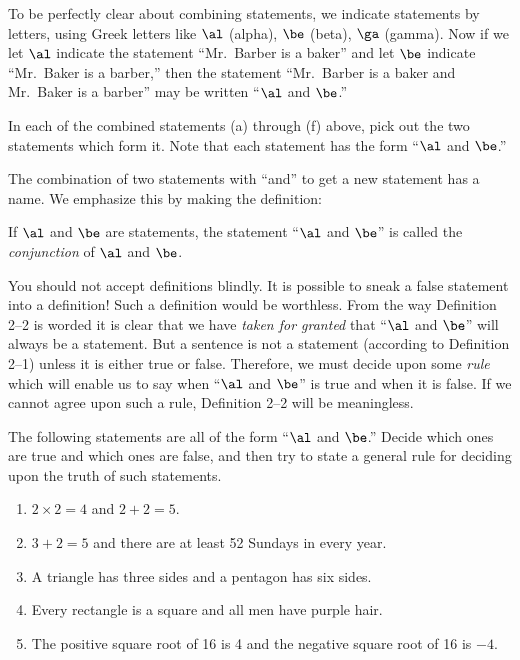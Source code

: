 \documentclass[11pt]{book}
\theoremstyle{bkplain}
\theoremstyle{XIplainnote}
\theoremstyle{bkplain}
\theoremstyle{bkplain}
\begin{document}
To be perfectly clear about combining statements, we indicate statements by
letters, using Greek letters like $\al$ (alpha), $\be$ (beta),
$\ga$ (gamma). Now if we let $\al$ indicate the statement ``Mr.\ Barber is a
baker'' and let $\be$ indicate ``Mr.\ Baker is a barber,'' then the statement
``Mr.\ Barber is a baker and Mr.\ Baker is a barber'' may be written
``$\al$ and $\be$.''

\begin{IIproblem}
In each of the combined statements (a) through (f) above, pick
out the two statements which form it. Note that each statement has the form
``$\al$ and $\be$.''
\end{IIproblem}

The combination of two statements with ``and'' to get a new statement has a name.
We emphasize this by making the definition:

\begin{definition}
If $\al$ and $\be$ are statements, the statement ``$\al$ and $\be$'' is called the
\emph{conjunction} of $\al$ and $\be$.
\end{definition}

You should not accept definitions blindly. It is possible to sneak a false
statement into a definition! Such a definition would be worthless. From the way
Definition 2--2 is worded it is clear that we have \emph{taken for granted} that
``$\al$ and $\be$'' will always be a statement. But a sentence is not a statement
(according to Definition 2--1) unless it is either true or false. Therefore, we
must decide upon some \emph{rule} which will enable us to say when ``$\al$ and
$\be$'' is true and when it is false. If we cannot agree upon such a rule,
Definition 2--2 will be meaningless.

The following statements are all of the form ``$\al$ and $\be$.'' Decide which
ones are true and which ones are false, and then try to state a general rule for
deciding upon the truth of such statements.

\begin{enumerate}[label=(\alph*), leftmargin=2.2em, itemsep=1pt, topsep=3pt]
\item $2 \times 2 = 4$ and $2 + 2 = 5$.
\item $3 + 2 = 5$ and there are at least 52 Sundays in every year.
\item A triangle has three sides and a pentagon has six sides.
\item Every rectangle is a square and all men have purple hair.
\item The positive square root of 16 is 4 and the negative square root of 16 is
      $-4$.
\end{enumerate}
\end{document}
